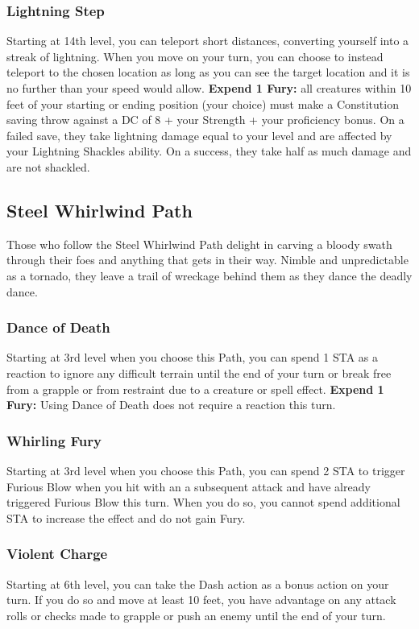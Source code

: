 \subsubsection{Lightning Step}
Starting at 14th level, you can teleport short distances, converting yourself into a streak of lightning. When you move on your turn, you can choose to instead teleport to the chosen location as long as you can see the target location and it is no further than your speed would allow. \textbf{Expend 1 Fury:} all creatures within 10 feet of your starting or ending position (your choice) must make a Constitution saving throw against a DC of 8 + your Strength + your proficiency bonus. On a failed save, they take lightning damage equal to your level and are affected by your Lightning Shackles ability. On a success, they take half as much damage and are not shackled.

\subsection{Steel Whirlwind Path}
Those who follow the Steel Whirlwind Path delight in carving a bloody swath through their foes and anything that gets in their way. Nimble and unpredictable as a tornado, they leave a trail of wreckage behind them as they dance the deadly dance.

\subsubsection{Dance of Death}
Starting at 3rd level when you choose this Path, you can spend 1 STA as a reaction to ignore any difficult terrain until the end of your turn or break free from a grapple or from restraint due to a creature or spell effect. \textbf{Expend 1 Fury:} Using Dance of Death does not require a reaction this turn.

\subsubsection{Whirling Fury}
Starting at 3rd level when you choose this Path, you can spend 2 STA to trigger Furious Blow when you hit with an a subsequent attack and have already triggered Furious Blow this turn. When you do so, you cannot spend additional STA to increase the effect and do not gain Fury.

\subsubsection{Violent Charge}
Starting at 6th level, you can take the Dash action as a bonus action on your turn. If you do so and move at least 10 feet, you have advantage on any attack rolls or checks made to grapple or push an enemy until the end of your turn.

